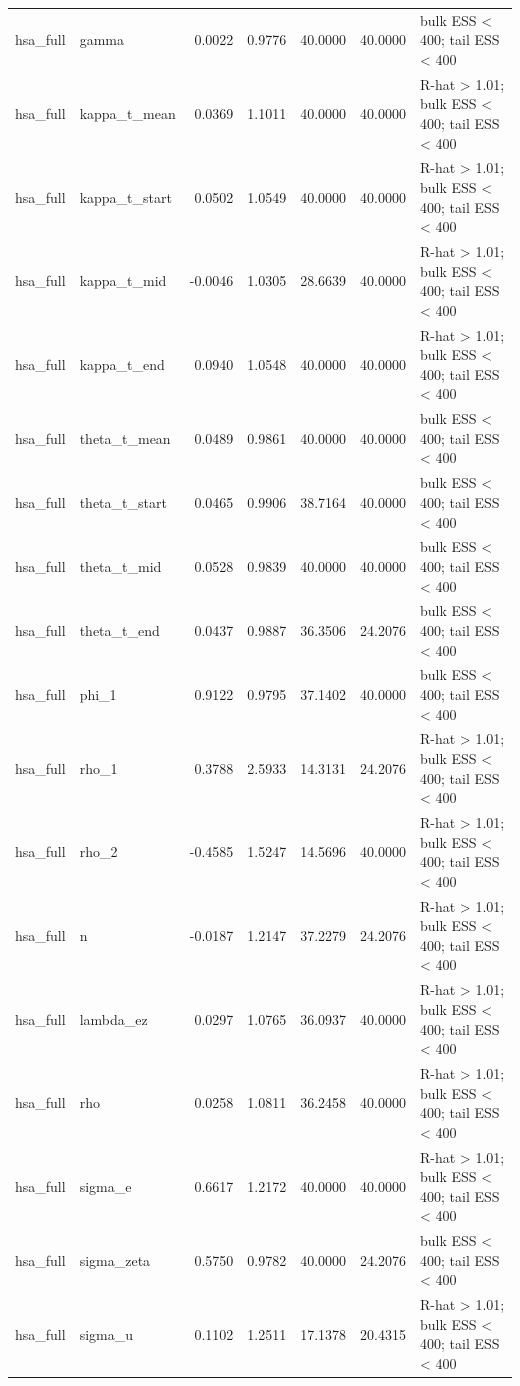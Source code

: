 \begin{tabular}{llrrrrl}
hsa\_full & gamma & 0.0022 & 0.9776 & 40.0000 & 40.0000 & bulk ESS < 400; tail ESS < 400 \\
hsa\_full & kappa\_t\_mean & 0.0369 & 1.1011 & 40.0000 & 40.0000 & R-hat > 1.01; bulk ESS < 400; tail ESS < 400 \\
hsa\_full & kappa\_t\_start & 0.0502 & 1.0549 & 40.0000 & 40.0000 & R-hat > 1.01; bulk ESS < 400; tail ESS < 400 \\
hsa\_full & kappa\_t\_mid & -0.0046 & 1.0305 & 28.6639 & 40.0000 & R-hat > 1.01; bulk ESS < 400; tail ESS < 400 \\
hsa\_full & kappa\_t\_end & 0.0940 & 1.0548 & 40.0000 & 40.0000 & R-hat > 1.01; bulk ESS < 400; tail ESS < 400 \\
hsa\_full & theta\_t\_mean & 0.0489 & 0.9861 & 40.0000 & 40.0000 & bulk ESS < 400; tail ESS < 400 \\
hsa\_full & theta\_t\_start & 0.0465 & 0.9906 & 38.7164 & 40.0000 & bulk ESS < 400; tail ESS < 400 \\
hsa\_full & theta\_t\_mid & 0.0528 & 0.9839 & 40.0000 & 40.0000 & bulk ESS < 400; tail ESS < 400 \\
hsa\_full & theta\_t\_end & 0.0437 & 0.9887 & 36.3506 & 24.2076 & bulk ESS < 400; tail ESS < 400 \\
hsa\_full & phi\_1 & 0.9122 & 0.9795 & 37.1402 & 40.0000 & bulk ESS < 400; tail ESS < 400 \\
hsa\_full & rho\_1 & 0.3788 & 2.5933 & 14.3131 & 24.2076 & R-hat > 1.01; bulk ESS < 400; tail ESS < 400 \\
hsa\_full & rho\_2 & -0.4585 & 1.5247 & 14.5696 & 40.0000 & R-hat > 1.01; bulk ESS < 400; tail ESS < 400 \\
hsa\_full & n & -0.0187 & 1.2147 & 37.2279 & 24.2076 & R-hat > 1.01; bulk ESS < 400; tail ESS < 400 \\
hsa\_full & lambda\_ez & 0.0297 & 1.0765 & 36.0937 & 40.0000 & R-hat > 1.01; bulk ESS < 400; tail ESS < 400 \\
hsa\_full & rho & 0.0258 & 1.0811 & 36.2458 & 40.0000 & R-hat > 1.01; bulk ESS < 400; tail ESS < 400 \\
hsa\_full & sigma\_e & 0.6617 & 1.2172 & 40.0000 & 40.0000 & R-hat > 1.01; bulk ESS < 400; tail ESS < 400 \\
hsa\_full & sigma\_zeta & 0.5750 & 0.9782 & 40.0000 & 24.2076 & bulk ESS < 400; tail ESS < 400 \\
hsa\_full & sigma\_u & 0.1102 & 1.2511 & 17.1378 & 20.4315 & R-hat > 1.01; bulk ESS < 400; tail ESS < 400 \\

\end{tabular}
